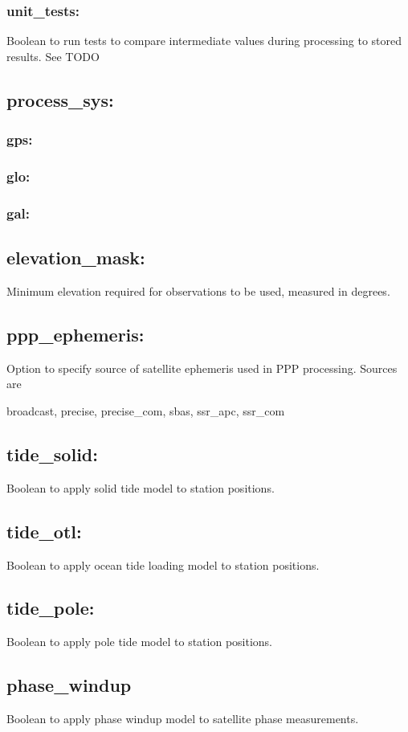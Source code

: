 \subsubsection{unit\_tests:}
Boolean to run tests to compare intermediate values during processing to stored results. See TODO

\subsection{process\_sys:}
\subsubsection{gps:}
\subsubsection{glo:}
\subsubsection{gal:}

\subsection{elevation\_mask:}
Minimum elevation required for observations to be used, measured in degrees.

\subsection{ppp\_ephemeris:}
Option to specify source of satellite ephemeris used in PPP processing. Sources are

broadcast,
precise,
precise\_com,
sbas,
ssr\_apc,
ssr\_com

\subsection{tide\_solid:}
Boolean to apply solid tide model to station positions.
\subsection{tide\_otl:}
Boolean to apply ocean tide loading model to station positions.
\subsection{tide\_pole:}
Boolean to apply pole tide model to station positions.
\subsection{phase\_windup}
Boolean to apply phase windup model to satellite phase measurements.
